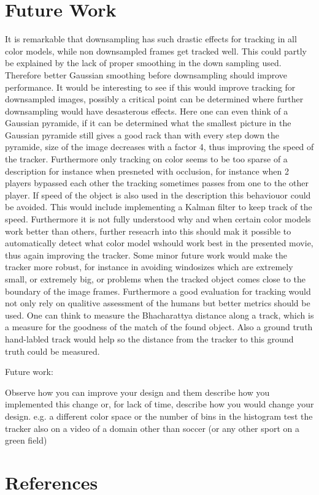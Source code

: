 \documentclass[a4paper,11pt]{article}
\begin{document}
\section{Future Work} \label{sec:fut}
It is remarkable that downsampling has such drastic effects for tracking in all color models, while non downsampled frames get tracked well. This could partly be explained by the lack of proper smoothing in the down sampling used. Therefore better Gaussian smoothing before downsampling should improve performance. It would be interesting to see if this would improve tracking for downsampled images, possibly a critical point can be determined where further downsampling would have desasterous effects.
Here one can even think of a Gaussian pyramide, if it can be determined what the smallest picture in the Gaussian pyramide still gives a good rack than with every step down the pyramide, size of the image decreases with a factor 4, thus improving the speed of the tracker. 
Furthermore only tracking on color seems to be too sparse of a description for instance when presneted with occlusion, for instance when 2 players bypassed each other the tracking sometimes passes from one to the other player. If speed of the object is also used in the description this behaviouor could be avoided. This would include implementing a Kalman filter to keep track of the speed. 
Furthermore it is not fully understood why and when certain color models work better than others, further reseacrh into this should mak it possible to automatically detect what color model wshould work best in the presented movie, thus again improving the tracker.
Some minor future work would make the tracker more robust, for instance in avoiding windosizes which are extremely small, or extremely big, or problems when the tracked object comes close to the boundary of the image frames. 
Furthermore a good evaluation for tracking would not only rely on qualitive assessment of the humans but better metrics should be used. One can think to measure the Bhacharattya distance along a track, which is a measure for the goodness of the match of the found object. Also a ground truth hand-labled track would help so the distance from the tracker to this ground truth could be measured.


Future work:


Observe how you can improve your design and them describe how you implemented this change or, for lack of time, describe how you would change your design. 
e.g. a different color space or the number of bins in the histogram
test the tracker also on a video of a domain other than soccer (or any other sport on a green field)





\section{References} 


\renewcommand\bibname{References}


\end{document}

